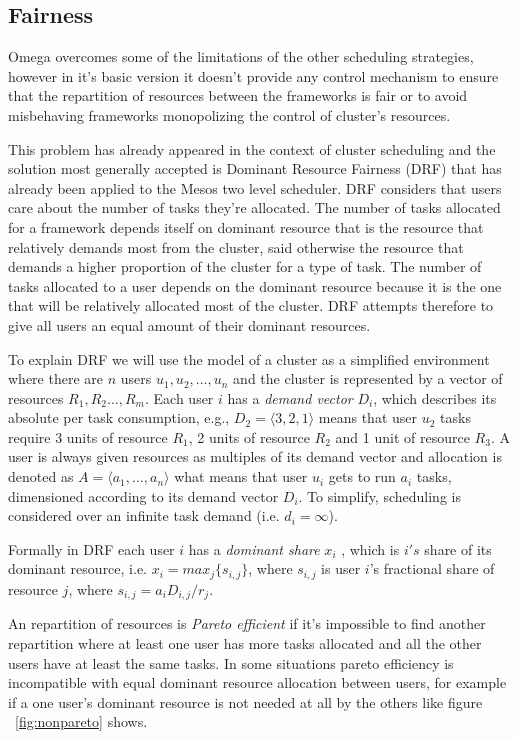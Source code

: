 \documentclass{report}                     %
\begin{document}
\subsection{Fairness}

Omega overcomes some of the limitations of the other
scheduling strategies, however in it's basic version it doesn't
provide any control mechanism to ensure that the repartition of
resources between the frameworks is fair or to avoid misbehaving
frameworks monopolizing the control of cluster's resources.

This problem has already appeared in the context of cluster scheduling
and the solution most generally accepted is Dominant Resource Fairness
(DRF) that has already been applied to the Mesos two level
scheduler. DRF considers that users care about the number of tasks
they're allocated. The number of tasks allocated for a framework
depends itself on dominant resource that is the resource that
relatively demands most from the cluster, said otherwise the resource
that demands a higher proportion of the cluster for a type of
task. The number of tasks allocated to a user depends on the dominant
resource because it is the one that will be relatively allocated most
of the cluster. DRF attempts therefore to give all users an equal
amount of their dominant resources.

To explain DRF we will use the model of a cluster as a simplified
environment where there are $n$ users $u_{1},u_{2},...,u_{n}$ and the
cluster is represented by a vector of resources
$R_{1},R_{2}...,R_{m}$. Each user $i$ has a \emph{demand vector}
$D_{i}$, which describes its absolute per task consumption, e.g.,
$D_{2} = \langle 3, 2, 1 \rangle$ means that user $u_{2}$ tasks
require 3 units of resource $R_{1}$, 2 units of resource $R_{2}$ and 1
unit of resource $R_{3}$. A user is always given resources as
multiples of its demand vector and allocation is denoted as $A =
\langle a_{1},...,a_{n} \rangle$ what means that user $u_{i}$ gets to
run $a_{i}$ tasks, dimensioned according to its demand vector
$D_{i}$. To simplify, scheduling is considered over an infinite task
demand (i.e. $d_{i} = \infty$).

Formally in DRF each user $i$ has a \emph{dominant share} $x_{i}$ ,
which is $i's$ share of its dominant resource, i.e. $x_{i} = max_{j}\{s_{i,j}\}$,
where $s_{i,j}$ is user $i$'s fractional share of resource $j$, where
$s_{i,j} = a_{i}D_{i,j}/r_{j}$.

An repartition of resources is \emph{Pareto efficient} if it's impossible
to find another repartition where at least one user has more tasks
allocated and all the other users have at least the same tasks. In some 
situations pareto efficiency is incompatible with equal dominant resource
allocation between users, for example if a one user's dominant resource
is not needed at all by the others like figure ~\ref{fig:nonpareto} shows. \\
\end{document}
